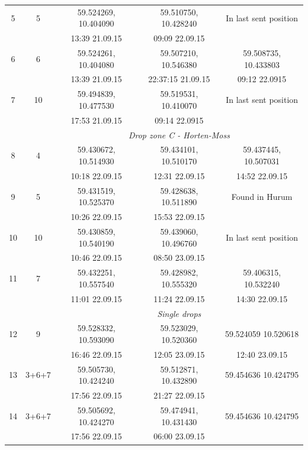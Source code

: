 \documentclass[12pt,a4paper,english]{article}
\begin{document}
\begin{table}[tb]
\begin{tabular}{|c|cccc|}
        5    & 5       & 59.524269, 10.404090 & 59.510750, 10.428240    & In last sent position     \\
             &         & 13:39 21.09.15       & 09:09 22.09.15          &                            \\
        6    & 6       & 59.524261, 10.404080 & 59.507210, 10.546380    & 59.508735, 10.433803       \\
             &         & 13:39 21.09.15       & 22:37:15 21.09.15       & 09:12 22.0915              \\
        7    & 10      & 59.494839, 10.477530 & 59.519531, 10.410070    & In last sent position      \\
             &         & 17:53 21.09.15       & 09:14 22.0915           &                            \\ \hline 
             &         &          \multicolumn{3}{c}{\textit{Drop zone C - Horten-Moss}}             \\
        8    & 4       & 59.430672, 10.514930 & 59.434101, 10.510170    & 59.437445, 10.507031       \\
             &         & 10:18 22.09.15       & 12:31 22.09.15          & 14:52 22.09.15             \\
        9    & 5       & 59.431519, 10.525370 & 59.428638, 10.511890    & Found in Hurum             \\
             &         & 10:26 22.09.15       & 15:53 22.09.15          &                            \\
        10   & 10      & 59.430859, 10.540190 & 59.439060, 10.496760    & In last sent position      \\
             &         & 10:46 22.09.15	      & 08:50 23.09.15          &                            \\
        11   & 7       & 59.432251, 10.557540 & 59.428982, 10.555320    & 59.406315, 10.532240       \\
             &         & 11:01 22.09.15       & 11:24 22.09.15          & 14:30 22.09.15             \\ \hline 
             &         &          \multicolumn{3}{c}{\textit{Single drops}}                          \\
        12   & 9       & 59.528332, 10.593090 & 59.523029, 10.520360    & 59.524059 10.520618        \\
             &         & 16:46 22.09.15       & 12:05 23.09.15          & 12:40 23.09.15             \\
        13   & 3+6+7   & 59.505730, 10.424240 & 59.512871,  10.432890   & 59.454636 10.424795        \\
             &         & 17:56 22.09.15       & 21:27 22.09.15          &                            \\
        14   & 3+6+7   & 59.505692, 10.424270 & 59.474941, 10.431430    & 59.454636 10.424795        \\
             &         & 17:56 22.09.15       & 06:00 23.09.15          &                            \\ 
\hline 
\end{tabular}
\end{table}
\clearpage
\end{document}
